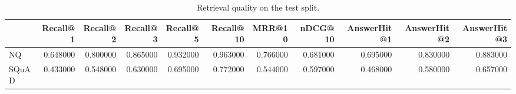 \begin{table}
\caption{Retrieval quality on the test split.}
\label{tab:retrieval}
\begin{tabular}{lrrrrrrrrrr}
\toprule
 & Recall@1 & Recall@2 & Recall@3 & Recall@5 & Recall@10 & MRR@10 & nDCG@10 & AnswerHit@1 & AnswerHit@2 & AnswerHit@3 \\
\midrule
NQ & 0.648000 & 0.800000 & 0.865000 & 0.932000 & 0.963000 & 0.766000 & 0.681000 & 0.695000 & 0.830000 & 0.883000 \\
SQuAD & 0.433000 & 0.548000 & 0.630000 & 0.695000 & 0.772000 & 0.544000 & 0.597000 & 0.468000 & 0.580000 & 0.657000 \\
\bottomrule
\end{tabular}
\end{table}
